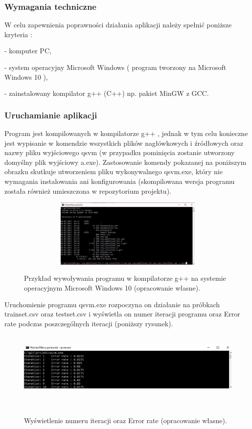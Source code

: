 \documentclass[[10pt,a4paper]{article}
\begin{document}
\begin{enumerate}
\begin{itemize}
\subsubsection{Wymagania techniczne}  

\noindent W celu zapewnienia poprawności działania aplikacji należy spełnić poniższe kryteria :

\noindent - komputer PC, 

\noindent - system operacyjny Microsoft Windows ( program tworzony na Microsoft Windows 10 ),

\noindent - zainstalowany kompilator g++ (C++) np. pakiet MinGW z GCC.

\subsubsection{Uruchamianie aplikacji}

\noindent 
Program jest kompilowanych w kompilatorze g++ , jednak w tym celu konieczne jest wypisanie w komendzie wszystkich plików nagłówkowych i źródłowych oraz nazwy pliku wyjściowego qsvm (w przypadku pominięcia zostanie utworzony domyślny plik wyjściowy a.exe). Zastosowanie komendy pokazanej na poniższym obrazku skutkuje utworzeniem pliku wykonywalnego qsvm.exe, który nie wymagania instalowania ani konfigurowania (skompilowana wersja programu została również umieszczona w repozytorium projektu).

\begin{figure}[h]
\centering
\includegraphics[width=4.50in, height=1.32in]{kompilacja.jpg}\\
\caption{Przykład wywoływania programu w kompilatorze g++ na systemie operacyjnym Microsoft Windows 10 (opracowanie własne).}
\end{figure}

\noindent Uruchomienie programu qsvm.exe rozpoczyna on działanie na próbkach trainset.csv oraz testset.csv i wyświetla on numer iteracji programu oraz Error rate podczas poszczególnych iteracji (poniższy rysunek). 
\begin{figure}[h]
\centering
\includegraphics[width=4.50in, height=1.32in]{wywolanie.jpg}\
\caption{Wyświetlenie numeru iteracji oraz Error rate (opracowanie własne).}
\end{figure}




\end{itemize}
\end{enumerate}
\end{document}
